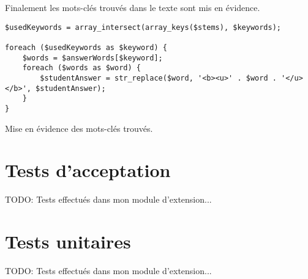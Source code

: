 Finalement les mots-clés trouvés dans le texte sont mis en évidence.

\begin{lstfloat}
\begin{lstlisting}[frame=l]
$usedKeywords = array_intersect(array_keys($stems), $keywords);

foreach ($usedKeywords as $keyword) {
	$words = $answerWords[$keyword];
	foreach ($words as $word) {
		$studentAnswer = str_replace($word, '<b><u>' . $word . '</u></b>', $studentAnswer);
	}
}
\end{lstlisting}
\caption{Mise en évidence des mots-clés trouvés.}
\label{code:commentaire}
\end{lstfloat}

\section{Tests d'acceptation}

TODO: Tests effectués dans mon module d'extension...

\section{Tests unitaires}

TODO: Tests effectués dans mon module d'extension...